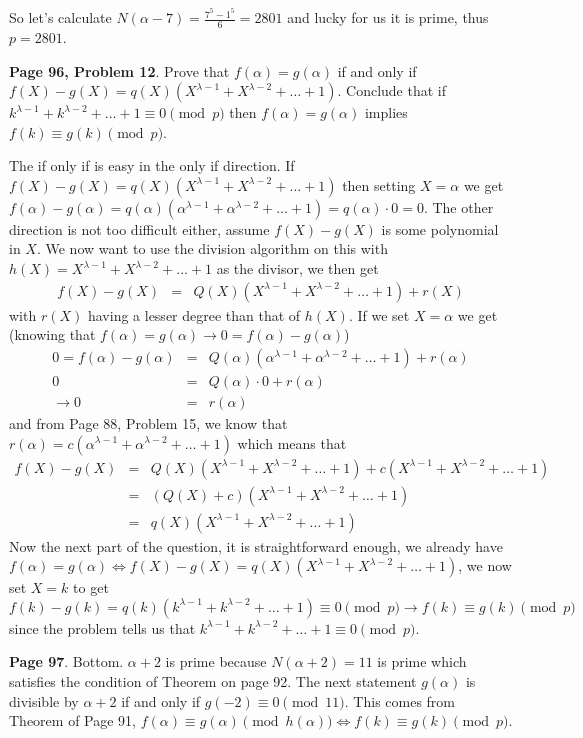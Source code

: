 \documentclass[aps,preprint,preprintnumbers,nofootinbib,showpacs,prd]{revtex4-1}
\newcommand{\nbea}{\begin{eqnarray*}}
\newcommand{\neea}{\end{eqnarray*}}
\begin{document}
So let's calculate $N(\alpha - 7) = \frac{7^5 - 1^5}{6} = 2801$ and lucky for us it is prime, thus $p = 2801$.

{\bf Page 96, Problem 12}. Prove that $f(\alpha) = g(\alpha)$ if and only if $f(X) - g(X) = q(X)(X^{\lambda - 1} + X^{\lambda-2} + \dots + 1)$. Conclude that if $k^{\lambda-1} + k^{\lambda-2} + \dots + 1 \equiv 0 \pmod{p}$ then $f(\alpha) = g(\alpha)$ implies $f(k) \equiv g(k) \pmod{p}$.

The if only if is easy in the only if direction. If $f(X) - g(X) = q(X)(X^{\lambda - 1} + X^{\lambda-2} + \dots + 1)$ then setting $X = \alpha$ we get $f(\alpha) - g(\alpha) = q(\alpha)(\alpha^{\lambda - 1} + \alpha^{\lambda-2} + \dots + 1) = q(\alpha) \cdot 0 = 0$. The other direction is not too difficult either, assume $f(X) - g(X)$ is some polynomial in $X$. We now want to use the division algorithm on this with $h(X) = X^{\lambda - 1} + X^{\lambda-2} + \dots + 1$ as the divisor, we then get
%
\nbea
f(X) - g(X) & = & Q(X)(X^{\lambda - 1} + X^{\lambda-2} + \dots + 1) + r(X)
\neea
%
with $r(X)$ having a lesser degree than that of $h(X)$. If we set $X = \alpha$ we get (knowing that $f(\alpha) = g(\alpha) \to 0 = f(\alpha) - g(\alpha)$)
%
\nbea
0 = f(\alpha) - g(\alpha) & = & Q(\alpha)(\alpha^{\lambda - 1} + \alpha^{\lambda-2} + \dots + 1) + r(\alpha) \\
0 & = & Q(\alpha) \cdot 0 + r(\alpha) \\
\to 0 & = & r(\alpha)
\neea
%
and from Page 88, Problem 15, we know that $r(\alpha) = c(\alpha^{\lambda - 1} + \alpha^{\lambda-2} + \dots + 1)$ which means that
%
\nbea
f(X) - g(X) & = & Q(X)(X^{\lambda - 1} + X^{\lambda-2} + \dots + 1) + c(X^{\lambda - 1} + X^{\lambda-2} + \dots + 1) \\
& = & (Q(X) + c)(X^{\lambda - 1} + X^{\lambda-2} + \dots + 1) \\
& = & q(X)(X^{\lambda - 1} + X^{\lambda-2} + \dots + 1)
\neea
%
Now the next part of the question, it is straightforward enough, we already have $f(\alpha) = g(\alpha) \Longleftrightarrow f(X) - g(X) = q(X)(X^{\lambda - 1} + X^{\lambda-2} + \dots + 1)$, we now set $X = k$ to get $f(k) - g(k) = q(k)(k^{\lambda - 1} + k^{\lambda-2} + \dots + 1) \equiv 0 \pmod{p} \to f(k) \equiv g(k) \pmod{p}$ since the problem tells us that $k^{\lambda-1} + k^{\lambda-2} + \dots + 1 \equiv 0 \pmod{p}$.

{\bf Page 97}. Bottom. $\alpha + 2$ is prime because $N(\alpha + 2) = 11$ is prime which satisfies the condition of Theorem on page 92. The next statement $g(\alpha)$ is divisible by $\alpha + 2$ if and only if $g(-2) \equiv 0 \pmod{11}$. This comes from Theorem of Page 91, $f(\alpha) \equiv g(\alpha) \pmod{h(\alpha)} \Longleftrightarrow f(k) \equiv g(k) \pmod{p}$.
\end{document}

